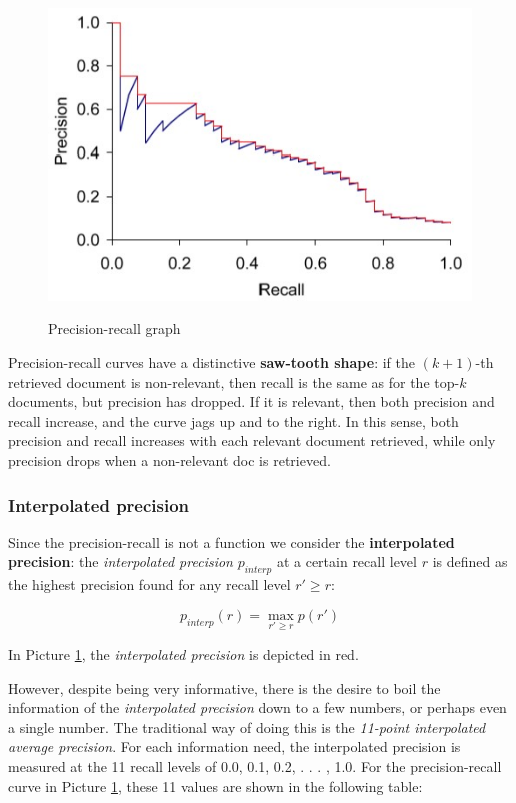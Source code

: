 \begin{figure}[h!]
		\centering
		\includegraphics[scale = 2.0]{img/precision recall.jpg}
		\label{precision recall}
        \caption{Precision-recall graph}
\end{figure}

Precision-recall curves have a distinctive \textbf{saw-tooth shape}: if the $(k + 1)$-th retrieved document is non-relevant, then recall is the same as for the top-$k$ documents, but precision has dropped. If it is relevant, then both precision and recall increase, and the curve jags up and to the right. In this sense, both precision and recall increases with each relevant document retrieved, while only precision drops when a non-relevant doc is retrieved.

\subsubsection{Interpolated precision}

Since the precision-recall is not a function we consider the \textbf{interpolated precision}: the \textit{interpolated precision} $p_{interp}$ at a certain recall level $r$ is defined as the highest precision found for any recall level $r' \geq r$:

$$
p_{interp}(r) = \max_{r' \geq r} p(r')
$$

In Picture \ref{precision recall}, the \textit{interpolated precision} is depicted in red.

However, despite being very informative, there is the desire to boil the information of the \textit{interpolated precision} down to a few numbers, or perhaps even a single number. The traditional way of doing this is the \textit{11-point interpolated average precision}. For each information need, the interpolated precision is measured at the 11 recall levels of 0.0, 0.1, 0.2, . . . , 1.0. For the precision-recall curve in Picture \ref{precision recall}, these 11 values are shown in the following table:

